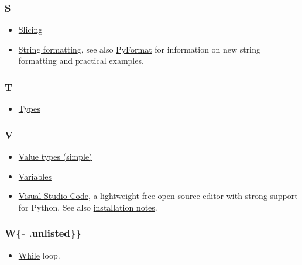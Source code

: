 \documentclass[
]{book}
\providecommand{\tightlist}{%
  \setlength{\itemsep}{0pt}\setlength{\parskip}{0pt}}
\begin{document}
\hypertarget{s}{%
\subsubsection*{S}\label{s}}

\begin{itemize}
\tightlist
\item
  \protect\hyperlink{lists}{Slicing}
\item
  \protect\hyperlink{string-formatting}{String formatting}, see also \href{https://pyformat.info/}{PyFormat} for information on new string formatting and practical examples.
\end{itemize}

\hypertarget{t}{%
\subsubsection*{T}\label{t}}

\begin{itemize}
\tightlist
\item
  \protect\hyperlink{value-types}{Types}
\end{itemize}

\hypertarget{v}{%
\subsubsection*{V}\label{v}}

\begin{itemize}
\item
  \protect\hyperlink{value-types}{Value types (simple)}
\item
  \protect\hyperlink{variables}{Variables}
\item
  \href{https://code.visualstudio.com/}{Visual Studio Code}, a lightweight free open-source editor with strong support for Python. See also \protect\hyperlink{install-vs-code}{installation notes}.
\end{itemize}

\hypertarget{w--.unlisted}{%
\subsubsection{W\{- .unlisted\}\}}\label{w--.unlisted}}

\begin{itemize}
\tightlist
\item
  \protect\hyperlink{while-loop}{While} loop.
\end{itemize}
\end{document}
